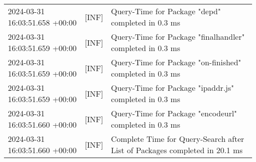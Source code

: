 {{\begin{tabularx}{\textwidth}{|l|l|X|}
                    2024-03-31 16:03:51.658 +00:00 & [INF] & Query-Time for Package "depd" completed in 0.3 ms \\
                    2024-03-31 16:03:51.659 +00:00 & [INF] & Query-Time for Package "finalhandler" completed in 0.3 ms \\
                    2024-03-31 16:03:51.659 +00:00 & [INF] & Query-Time for Package "on-finished" completed in 0.3 ms \\
                    2024-03-31 16:03:51.659 +00:00 & [INF] & Query-Time for Package "ipaddr.js" completed in 0.3 ms \\
                    2024-03-31 16:03:51.660 +00:00 & [INF] & Query-Time for Package "encodeurl" completed in 0.3 ms \\
                    2024-03-31 16:03:51.660 +00:00 & [INF] & Complete Time for Query-Search after List of Packages completed in 20.1 ms \\
                    \hline
                \end{tabularx}
            }
        }

